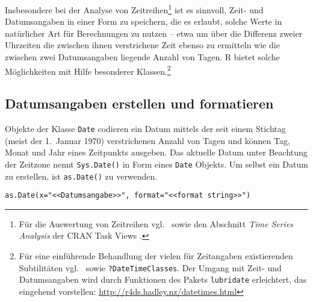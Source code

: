Insbesondere bei der Analyse von Zeitreihen\footnote{Für die Auswertung von Zeitreihen vgl.\  sowie den Abschnitt \emph{Time Series Analysis} der CRAN Task Views \cite{CRANtvTimeSeries}.} ist es sinnvoll, Zeit- und Datumsangaben in einer Form zu speichern, die es erlaubt, solche Werte in natürlicher Art für Berechnungen zu nutzen -- etwa um über die Differenz zweier Uhrzeiten die zwischen ihnen verstrichene Zeit ebenso zu ermitteln wie die zwischen zwei Datumsangaben liegende Anzahl von Tagen. R bietet solche Möglichkeiten mit Hilfe besonderer Klassen.\footnote{Für eine einführende Behandlung der vielen für Zeitangaben existierenden Subtilitäten vgl.\  sowie \lstinline!?DateTimeClasses!. Der Umgang mit Zeit- und Datumsangaben wird durch Funktionen des Pakets \lstinline!lubridate! \cite{Grolemund2011} erleichtert, das  eingehend vorstellen: \url{http://r4ds.hadley.nz/datetimes.html}}

\subsection{Datumsangaben erstellen und formatieren}
\label{sec:dateFormat}

Objekte der Klasse \lstinline!Date! codieren ein Datum mittels der seit einem Stichtag (meist der 1.\ Januar 1970) verstrichenen Anzahl von Tagen und können Tag, Monat und Jahr eines Zeitpunkts ausgeben. Das aktuelle Datum unter Beachtung der Zeitzone nennt \lstinline!Sys.Date()! in Form eines \lstinline!Date! Objekts. Um selbst ein Datum zu erstellen, ist \lstinline!as.Date()! zu verwenden.
\begin{lstlisting}
as.Date(x="<<Datumsangabe>>", format="<<format string>>")
\end{lstlisting}

